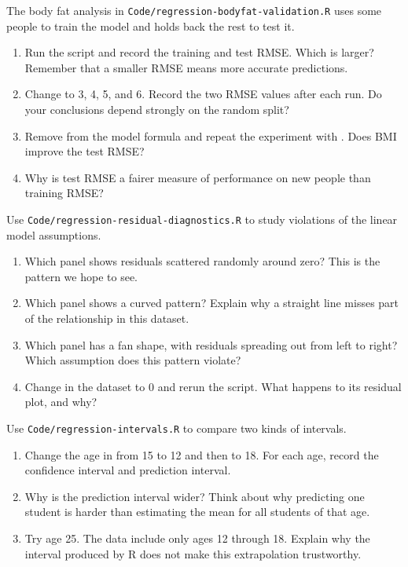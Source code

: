\begin{exercise}
The body fat analysis in \lstinline{Code/regression-bodyfat-validation.R} uses
some people to train the model and holds back the rest to test it.
\begin{enumerate}
  \item Run the script and record the training and test RMSE. Which is larger?
    Remember that a smaller RMSE means more accurate predictions.
  \item Change  to 3, 4, 5, and 6. Record the two RMSE values
    after each run. Do your conclusions depend strongly on the random split?
  \item Remove  from the model formula and repeat the experiment
    with . Does BMI improve the test RMSE?
  \item Why is test RMSE a fairer measure of performance on new people than
    training RMSE?
\end{enumerate}
\end{exercise}

\begin{exercise}
Use \lstinline{Code/regression-residual-diagnostics.R} to study violations of
the linear model assumptions.
\begin{enumerate}
  \item Which panel shows residuals scattered randomly around zero? This is the
    pattern we hope to see.
  \item Which panel shows a curved pattern? Explain why a straight line misses
    part of the relationship in this dataset.
  \item Which panel has a fan shape, with residuals spreading out from left to
    right? Which assumption does this pattern violate?
  \item Change  in the  dataset to 0 and rerun the
    script. What happens to its residual plot, and why?
\end{enumerate}
\end{exercise}

\begin{exercise}
Use \lstinline{Code/regression-intervals.R} to compare two kinds of intervals.
\begin{enumerate}
  \item Change the age in  from 15 to 12 and then to 18. For
    each age, record the confidence interval and prediction interval.
  \item Why is the prediction interval wider? Think about why predicting one
    student is harder than estimating the mean for all students of that age.
  \item Try age 25. The data include only ages 12 through 18. Explain why the
    interval produced by R does not make this extrapolation trustworthy.
\end{enumerate}
\end{exercise}

